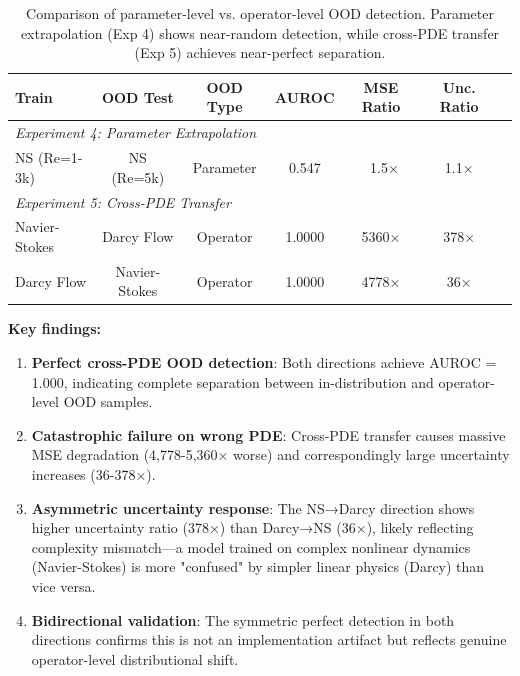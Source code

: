 \begin{table}[htbp]
\centering
\caption{Comparison of parameter-level vs. operator-level OOD detection. Parameter extrapolation (Exp 4) shows near-random detection, while cross-PDE transfer (Exp 5) achieves near-perfect separation.}
\label{tab:cross_pde_ood_results}
\begin{tabular}{lcccccc}
\toprule
\textbf{Train} & \textbf{OOD Test} & \textbf{OOD Type} & \textbf{AUROC} & \textbf{MSE Ratio} & \textbf{Unc. Ratio} \\
\midrule
\multicolumn{6}{l}{\textit{Experiment 4: Parameter Extrapolation}} \\
\midrule
NS (Re=1-3k) & NS (Re=5k) & Parameter & 0.547 & ~1.5× & 1.1× \\
\midrule
\multicolumn{6}{l}{\textit{Experiment 5: Cross-PDE Transfer}} \\
\midrule
Navier-Stokes & Darcy Flow & Operator & 1.0000 & 5360× & 378× \\
Darcy Flow & Navier-Stokes & Operator & 1.0000 & 4778× & 36× \\
\bottomrule
\end{tabular}
\end{table}

\textbf{Key findings:}

\begin{enumerate}
\item \textbf{Perfect cross-PDE OOD detection}: Both directions achieve AUROC = 1.000, indicating complete separation between in-distribution and operator-level OOD samples.

\item \textbf{Catastrophic failure on wrong PDE}: Cross-PDE transfer causes massive MSE degradation (4,778-5,360× worse) and correspondingly large uncertainty increases (36-378×).

\item \textbf{Asymmetric uncertainty response}: The NS→Darcy direction shows higher uncertainty ratio (378×) than Darcy→NS (36×), likely reflecting complexity mismatch—a model trained on complex nonlinear dynamics (Navier-Stokes) is more "confused" by simpler linear physics (Darcy) than vice versa.

\item \textbf{Bidirectional validation}: The symmetric perfect detection in both directions confirms this is not an implementation artifact but reflects genuine operator-level distributional shift.
\end{enumerate}

